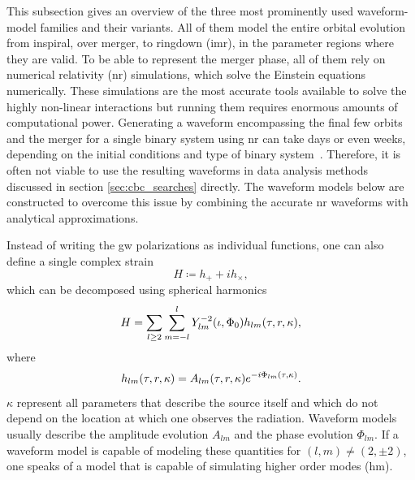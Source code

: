 This subsection gives an overview of the three most prominently used waveform-model families and their variants. All of them model the entire orbital evolution from inspiral, over merger, to ringdown (\acrshort{imr}), in the parameter regions where they are valid. To be able to represent the merger phase, all of them rely on numerical relativity (\acrshort{nr}) simulations, which solve the Einstein equations numerically. These simulations are the most accurate tools available to solve the highly non-linear interactions but running them requires enormous amounts of computational power. Generating a waveform encompassing the final few orbits and the merger for a single binary system using \acrshort{nr} can take days or even weeks, depending on the initial conditions and type of binary system~\cite{Hannam:2009rd}. Therefore, it is often not viable to use the resulting waveforms in data analysis methods discussed in section \ref{sec:cbc_searches} directly. The waveform models below are constructed to overcome this issue by combining the accurate \acrshort{nr} waveforms with analytical approximations.

Instead of writing the \acrshort{gw} polarizations as individual functions, one can also define a single complex strain
\begin{equation}
H\coloneqq h_+ + i h_\times,
\end{equation}
which can be decomposed using spherical harmonics~\cite{Thorne:1980ru, Dhurkunde:2022aek}
\begin{equation}\label{eq:complex_waveform}
H=\sum_{l\geq 2}\sum_{m=-l}^l Y^{-2}_{lm}{\left( \iota, \Phi_0 \right)}h_{lm}{\left( \tau, r, \kappa \right)},
\end{equation}
where
\begin{equation}
h_{lm}{\left( \tau, r, \kappa \right)} = A_{lm}{\left( \tau, r, \kappa \right)} e^{-i\Phi_{lm}{\left( \tau, \kappa \right)}}.
\end{equation}
$\kappa$ represent all parameters that describe the source itself and which do not depend on the location at which one observes the radiation. Waveform models usually describe the amplitude evolution $A_{lm}$ and the phase evolution $\Phi_{lm}$. If a waveform model is capable of modeling these quantities for $(l, m) \neq (2, \pm 2)$, one speaks of a model that is capable of simulating higher order modes (\acrshort{hm}).


